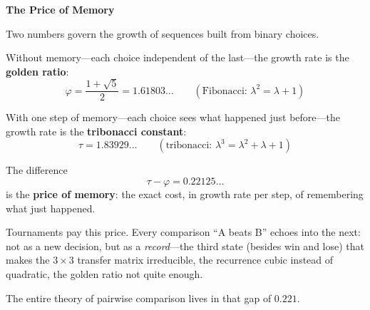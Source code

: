 \documentclass[12pt]{article}
\begin{document}
\begin{center}
{\Large\bfseries The Price of Memory}
\end{center}

\medskip

Two numbers govern the growth of sequences built from binary choices.

Without memory---each choice independent of the last---the growth rate is the \textbf{golden ratio}:
\[
\varphi = \frac{1+\sqrt{5}}{2} = 1.61803\ldots \qquad (\text{Fibonacci: } \lambda^2 = \lambda + 1)
\]

With one step of memory---each choice sees what happened just before---the growth rate is the \textbf{tribonacci constant}:
\[
\tau = 1.83929\ldots \qquad (\text{tribonacci: } \lambda^3 = \lambda^2 + \lambda + 1)
\]

The difference
\[
\tau - \varphi = 0.22125\ldots
\]
is the \textbf{price of memory}: the exact cost, in growth rate per step, of remembering what just happened.

Tournaments pay this price. Every comparison ``A beats B'' echoes into the next: not as a new decision, but as a \emph{record}---the third state (besides win and lose) that makes the $3 \times 3$ transfer matrix irreducible, the recurrence cubic instead of quadratic, the golden ratio not quite enough.

The entire theory of pairwise comparison lives in that gap of $0.221$.
\end{document}
